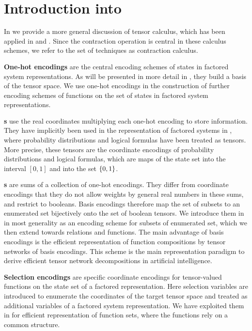 \chapter{Introduction into }

In  we provide a more general discussion of tensor calculus, which has been applied in  and .
Since the contraction operation is central in these calculus schemes, we refer to the set of techniques as contraction calculus.


\textbf{One-hot encodings} are the central encoding schemes of states in factored system representations.
As will be presented in more detail in , they build a basis of the tensor space.
We use one-hot encodings in the construction of further encoding schemes of functions on the set of states in factored system representations.

\textbf{\CoordinateEncoding{}s} use the real coordinates multiplying each one-hot encoding to store information.
They have implicitly been used in the representation of factored systems in , where probability distributions and logical formulas have been treated as tensors.
More precise, these tensors are the coordinate encodings of probability distributions and logical formulas, which are maps of the state set into the interval $[0,1]$ and into the set $\{0,1\}$.

\textbf{\BasisEncoding{}s} are sums of a collection of one-hot encodings.
They differ from coordinate encodings that they do not allow weights by general real numbers in these sums, and restrict to booleans.
Basis encodings therefore map the set of subsets to an enumerated set bijectively onto the set of boolean tensors.
We introduce them in  in most generality as an encoding scheme for subsets of enumerated set, which we then extend towards relations and functions.
The main advantage of basis encodings is the efficient representation of function compositions by tensor networks of basis encodings.
This scheme is the main representation paradigm to derive efficient tensor network decompositions in artificial intelligence.

\textbf{Selection encodings} are specific coordinate encodings for tensor-valued functions on the state set of a factored representation.
Here selection variables are introduced to enumerate the coordinates of the target tensor space and treated as additional variables of a factored system representation.
We have exploited them in  for efficient representation of function sets, where the functions rely on a common structure.

